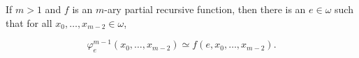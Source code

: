 If $m > 1$ and $f$ is an $m$-ary partial recursive function, then there is an $e \in \omega$ such that for all $x_0, \dots, x_{m-2} \in \omega$,

$$\varphi^{m-1}_e(x_0, \dots, x_{m-2}) \simeq f(e, x_0, \dots, x_{m-2}).$$
